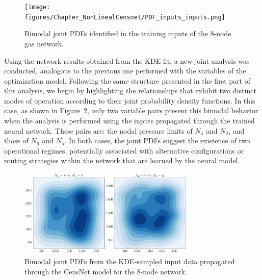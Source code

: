 \begin{figure}[h]
    \begin{center}
        \texttt{[image: figures/Chapter\_NonLinealCensnet/PDF\_inputs\_inputs.png]}
    \end{center}
    \caption{Bimodal joint PDFs identified in the training inputs of the 8-node gas network. }\label{fig:joint_distributions_input_input}
\end{figure}

Using the network results obtained from the KDE fit, a new joint analysis was conducted, analogous to the previous one performed with the variables of the optimization model. Following the same structure presented in the first part of this analysis, we begin by highlighting the relationships that exhibit two distinct modes of operation according to their joint probability density functions. In this case, as shown in Figure~\cref{fig:joint_distributions_input_input_KDE}, only two variable pairs present this bimodal behavior when the analysis is performed using the inputs propagated through the trained neural network. These pairs are: the nodal pressure limits of $N_4$ and $N_2$, and those of $N_6$ and $N_5$. In both cases, the joint PDFs suggest the existence of two operational regimes, potentially associated with alternative configurations or routing strategies within the network that are learned by the neural model. 


\begin{figure}[htbp]
    \begin{center}
        \includegraphics[width=0.75\textwidth]{figures/Chapter_NonLinealCensnet/PDF_inputs_inputs (Sampled).png}
    \end{center}
    \caption{Bimodal joint PDFs from the KDE-sampled input data propagated through the CensNet model for the 8-node network.}
    \label{fig:joint_distributions_input_input_KDE}
\end{figure}
 


